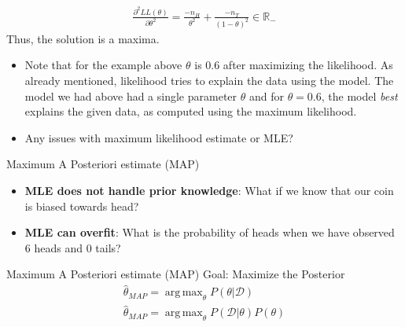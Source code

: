 \documentclass{beamer}
\newcommand{\data}{\mathcal{D}}
\DeclareMathOperator*{\argmax}{arg\,max}
\begin{document}
\begin{frame}{}
\begin{align*}
\frac{\partial^2 LL(\theta)}{\partial \theta^2} = \frac{-n_H}{\theta^2} + \frac{-n_T}{(1-\theta)^2} \in \mathbb R_-
\end{align*}
Thus, the solution is a maxima.
\begin{itemize}
    \item Note that for the example above $\theta$ is 0.6 after maximizing the likelihood. As already mentioned, likelihood tries to explain the data using the model. The model we had above had a single parameter $\theta$ and for $\theta = 0.6$, the model \emph{best} explains the given data, as computed using the maximum likelihood. 
\item Any issues with maximum likelihood estimate or MLE?

\end{itemize}

\end{frame}

\begin{frame}{Maximum A Posteriori estimate (MAP)}
\begin{itemize}


\item \textbf{MLE does not handle prior knowledge}: What if we know that our coin is biased towards head?
\item \textbf{MLE can overfit}: What is the probability of heads when we have observed 6 heads and 0 tails?
\end{itemize}

\end{frame}


\begin{frame}{Maximum A Posteriori estimate (MAP)}
Goal: Maximize the Posterior
	\begin{align}
\hat{\theta}_{MAP} = \argmax_\theta P(\theta|\data)\\
\hat{\theta}_{MAP}= \argmax_\theta P(\data|\theta)P(\theta)
\end{align}

\end{frame}
\end{document}
